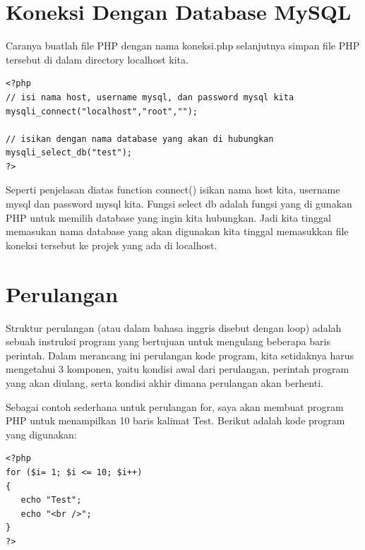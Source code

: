 \section{Koneksi Dengan Database MySQL}
Caranya buatlah file PHP dengan nama koneksi.php selanjutnya simpan file PHP tersebut di dalam directory localhost kita.
\begin{lstlisting}
<?php 
// isi nama host, username mysql, dan password mysql kita
mysqli_connect("localhost","root","");
 
// isikan dengan nama database yang akan di hubungkan
mysqli_select_db("test");
?>
\end{lstlisting}
Seperti penjelasan diatas function connect() isikan nama host kita, username mysql dan password mysql kita. Fungsi select db adalah fungsi yang di gunakan PHP untuk memilih database yang ingin kita hubungkan. Jadi kita tinggal memasukan nama database yang akan digunakan kita tinggal memasukkan file koneksi tersebut ke projek yang ada di localhost. 

\section{Perulangan}
Struktur perulangan (atau dalam bahasa inggris disebut dengan loop) adalah sebuah instruksi program yang bertujuan untuk mengulang beberapa baris perintah. Dalam merancang ini perulangan kode program, kita setidaknya harus mengetahui 3 komponen, yaitu kondisi awal dari perulangan, perintah program yang akan diulang, serta kondisi akhir dimana perulangan akan berhenti.
\par
Sebagai contoh sederhana untuk perulangan for, saya akan membuat program PHP untuk menampilkan 10 baris kalimat Test. Berikut adalah kode program yang digunakan:
\begin{lstlisting}
<?php
for ($i= 1; $i <= 10; $i++)
{
   echo "Test";
   echo "<br />";
}
?>
\end{lstlisting}

